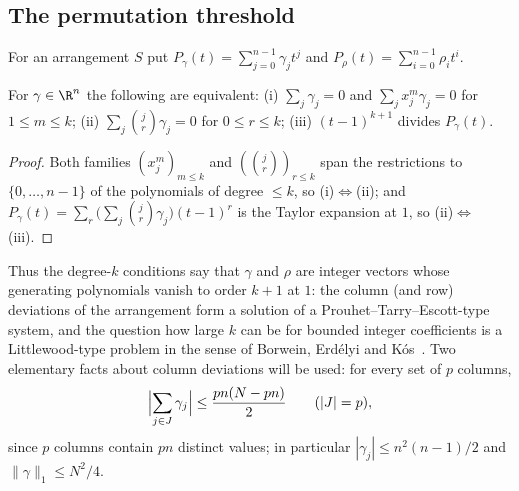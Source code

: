 
\subsection{The permutation threshold}
\label{sec:kstar}

For an arrangement $S$ put $P_\gamma(t)=\sum_{j=0}^{n-1}\gamma_jt^{j}$ and $P_\rho(t)=\sum_{i=0}^{n-1}\rho_it^{i}$.

\begin{lemma}
\label{lem:poly_form}
For $\gamma\in\R^{n}$ the following are equivalent: (i) $\sum_j\gamma_j=0$ and $\sum_jx_j^{m}\gamma_j=0$ for $1\le m\le k$;
(ii) $\sum_j\binom{j}{r}\gamma_j=0$ for $0\le r\le k$; (iii) $(t-1)^{k+1}$ divides $P_\gamma(t)$.
\end{lemma}

\begin{proof}
Both families $(x_j^{m})_{m\le k}$ and $(\binom{j}{r})_{r\le k}$ span the restrictions to $\{0,\dots,n-1\}$ of the polynomials of
degree $\le k$, so (i)$\Leftrightarrow$(ii); and $P_\gamma(t)=\sum_{r}\bigl(\sum_j\binom jr\gamma_j\bigr)(t-1)^{r}$ is the Taylor
expansion at $1$, so (ii)$\Leftrightarrow$(iii).
\end{proof}

Thus the degree-$k$ conditions say that $\gamma$ and $\rho$ are integer vectors whose generating polynomials vanish to order $k+1$
at $1$: the column (and row) deviations of the arrangement form a solution of a Prouhet--Tarry--Escott-type system, and the question
how large $k$ can be for bounded integer coefficients is a Littlewood-type problem in the sense of Borwein, Erd\'elyi and
K\'os~\cite{BEK1999}.  Two elementary facts about column deviations will be used: for every set of $p$ columns,
\begin{equation}
\Bigl|\sum_{j\in J}\gamma_j\Bigr|\le \frac{pn(N-pn)}{2}\qquad(|J|=p),
\label{eq:col_feasible}
\end{equation}
since $p$ columns contain $pn$ distinct values; in particular $|\gamma_j|\le n^{2}(n-1)/2$ and $\|\gamma\|_1\le N^{2}/4$.

